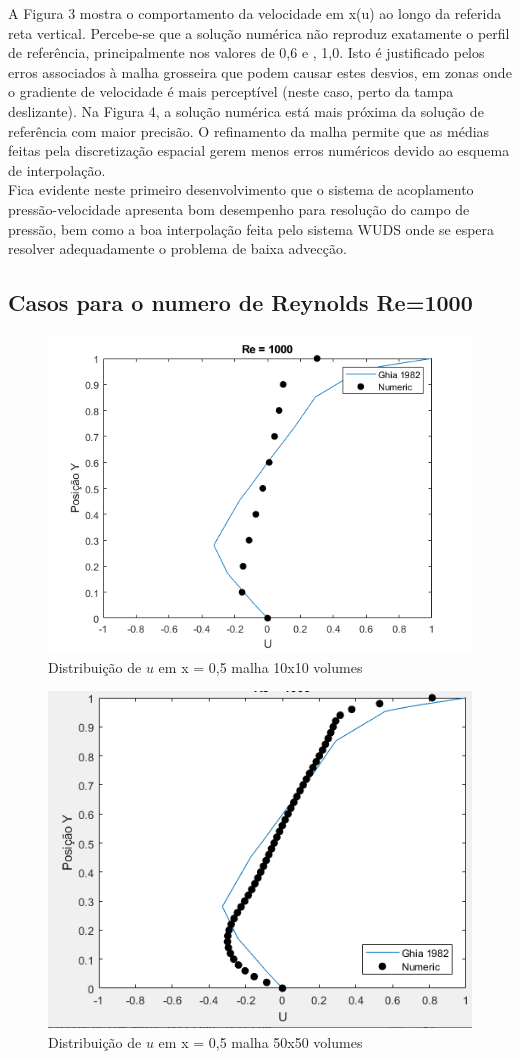 \documentclass[]{article}
\begin{document}
A Figura 3 mostra o comportamento da velocidade em x(u) ao longo da referida reta vertical. Percebe-se que a solução numérica não reproduz exatamente o perfil de referência, principalmente nos valores de 0,6 e , 1,0. Isto é justificado pelos erros associados à malha grosseira que podem causar estes desvios, em zonas onde o gradiente de velocidade é mais perceptível (neste caso, perto da tampa deslizante). Na Figura 4, a solução numérica está mais próxima da solução de referência com maior precisão. O refinamento da malha permite que as médias feitas pela discretização espacial gerem menos erros numéricos devido ao esquema de interpolação. \\

Fica evidente neste primeiro desenvolvimento que o sistema de acoplamento pressão-velocidade apresenta bom desempenho para resolução do campo de pressão, bem como a boa interpolação feita pelo sistema WUDS onde se espera resolver adequadamente o problema de baixa advecção.

\subsection*{Casos para o numero de Reynolds Re=1000}


\begin{figure}[H]
	\centering
	\includegraphics[width=.65\textwidth]{figures/5}
	\caption{Distribuição de $u$ em x = 0,5 malha 10x10 volumes}
\end{figure}

\begin{figure}[H]
	\centering
	\includegraphics[width=.65\textwidth]{figures/6}
	\caption{Distribuição de $u$ em x = 0,5 malha 50x50 volumes}
\end{figure}
\end{document}
